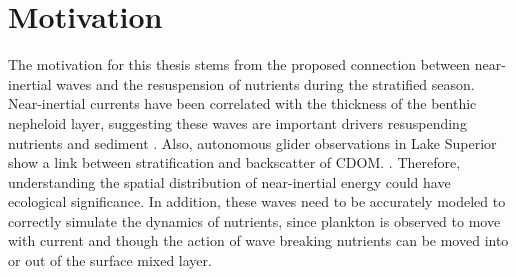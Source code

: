 




\section{Motivation}

The motivation for this thesis stems from the proposed connection between near-inertial waves and the resuspension of nutrients during the stratified season. 
Near-inertial currents have been correlated with the thickness of the benthic nepheloid layer, suggesting these waves are important drivers resuspending 
nutrients and sediment \citep{hawley_2004}. Also, autonomous glider observations in Lake Superior show a link between stratification and backscatter 
of CDOM. \citep{austin_2013}. Therefore, understanding the spatial distribution of near-inertial energy could have ecological significance. In addition, these
waves need to be accurately modeled to correctly simulate the dynamics of nutrients, since plankton is observed to move with current and though 
the action of wave breaking nutrients can be moved into or out of the surface mixed layer. 

